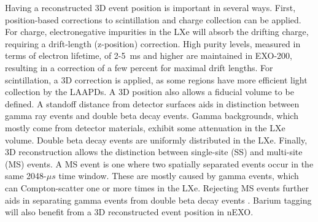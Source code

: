 Having a reconstructed 3D event position is important in several ways.  First, position-based corrections to scintillation and charge collection can be applied.  For charge, electronegative impurities in the LXe will absorb the drifting charge, requiring a drift-length (z-position) correction.  High purity levels, measured in terms of electron lifetime, of 2-5~ms and higher are maintained in EXO-200, resulting in a correction of a few percent for maximal drift lengths.  For scintillation, a 3D correction is applied, as some regions have more efficient light collection by the LAAPDs.  A 3D position also allows a fiducial volume to be defined.  A standoff distance from detector surfaces aids in distinction between gamma ray events and double beta decay events.  Gamma backgrounds, which mostly come from detector materials, exhibit some attenuation in the LXe volume.  Double beta decay events are uniformly distributed in the LXe.  Finally, 3D reconstruction allows the distinction between single-site (SS) and multi-site (MS) events.  A MS event is one where two spatially separated events occur in the same 2048-$\mu s$ time window.  These are mostly caused by gamma events, which can Compton-scatter one or more times in the LXe.  Rejecting MS events further aids in separating gamma events from double beta decay events \cite{EXO200TwoNuLong}.  Barium tagging will also benefit from a 3D reconstructed event position in nEXO.


